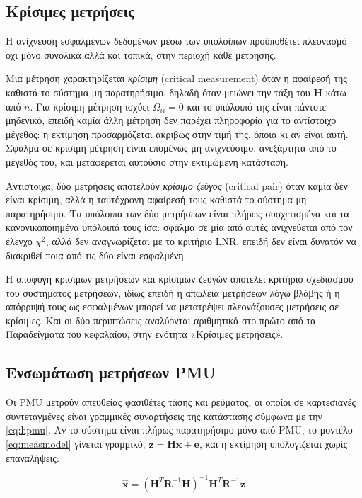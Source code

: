 \subsection{Κρίσιμες μετρήσεις}
\label{sec:critical}

Η ανίχνευση εσφαλμένων δεδομένων μέσω των υπολοίπων προϋποθέτει πλεονασμό όχι μόνο συνολικά
αλλά και τοπικά, στην περιοχή κάθε μέτρησης.

Μια μέτρηση χαρακτηρίζεται \emph{κρίσιμη} (critical measurement) όταν η αφαίρεσή της καθιστά το
σύστημα μη παρατηρήσιμο, δηλαδή όταν μειώνει την τάξη του $\mathbf{H}$ κάτω από $n$. Για
κρίσιμη μέτρηση ισχύει $\Omega_{ii} = 0$ και το υπόλοιπό της είναι πάντοτε μηδενικό, επειδή
καμία άλλη μέτρηση δεν παρέχει πληροφορία για το αντίστοιχο μέγεθος: η εκτίμηση προσαρμόζεται
ακριβώς στην τιμή της, όποια κι αν είναι αυτή. Σφάλμα σε κρίσιμη μέτρηση είναι επομένως μη
ανιχνεύσιμο, ανεξάρτητα από το μέγεθός του, και μεταφέρεται αυτούσιο στην εκτιμώμενη
κατάσταση.

Αντίστοιχα, δύο μετρήσεις αποτελούν \emph{κρίσιμο ζεύγος} (critical pair) όταν καμία δεν είναι
κρίσιμη, αλλά η ταυτόχρονη αφαίρεσή τους καθιστά το σύστημα μη παρατηρήσιμο. Τα υπόλοιπα των
δύο μετρήσεων είναι πλήρως συσχετισμένα και τα κανονικοποιημένα υπόλοιπά τους ίσα: σφάλμα σε
μία από αυτές ανιχνεύεται από τον έλεγχο $\chi^2$, αλλά δεν αναγνωρίζεται με το κριτήριο LNR,
επειδή δεν είναι δυνατόν να διακριθεί ποια από τις δύο είναι εσφαλμένη.

Η αποφυγή κρίσιμων μετρήσεων και κρίσιμων ζευγών αποτελεί κριτήριο σχεδιασμού του συστήματος
μετρήσεων, ιδίως επειδή η απώλεια μετρήσεων λόγω βλάβης ή η απόρριψή τους ως εσφαλμένων
μπορεί να μετατρέψει πλεονάζουσες μετρήσεις σε κρίσιμες. Και οι δύο περιπτώσεις αναλύονται αριθμητικά
στο πρώτο από τα Παραδείγματα του κεφαλαίου, στην ενότητα «Κρίσιμες μετρήσεις».

\subsection{Ενσωμάτωση μετρήσεων PMU}

Οι PMU μετρούν απευθείας φασιθέτες τάσης και ρεύματος, οι οποίοι σε καρτεσιανές συντεταγμένες
είναι γραμμικές συναρτήσεις της κατάστασης σύμφωνα με την \eqref{eq:hpmu}. Αν το σύστημα είναι
πλήρως παρατηρήσιμο μόνο από PMU, το μοντέλο \eqref{eq:measmodel} γίνεται γραμμικό,
$\mathbf{z} = \mathbf{H}\mathbf{x} + \mathbf{e}$, και η εκτίμηση υπολογίζεται χωρίς
επαναλήψεις:

\begin{equation}
\hat{\mathbf{x}} = \left(\mathbf{H}^{T}\mathbf{R}^{-1}\mathbf{H}\right)^{-1}
                    \mathbf{H}^{T}\mathbf{R}^{-1}\mathbf{z}
\label{eq:linse}
\end{equation}

